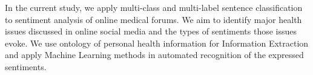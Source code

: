 In the current study, we apply multi-class and multi-label sentence classification to sentiment analysis of online medical forums.  We aim to identify major health issues discussed in online social media and the types of sentiments those issues evoke. We use ontology of personal health information for Information Extraction and apply Machine Learning methods in automated recognition of the expressed sentiments.
